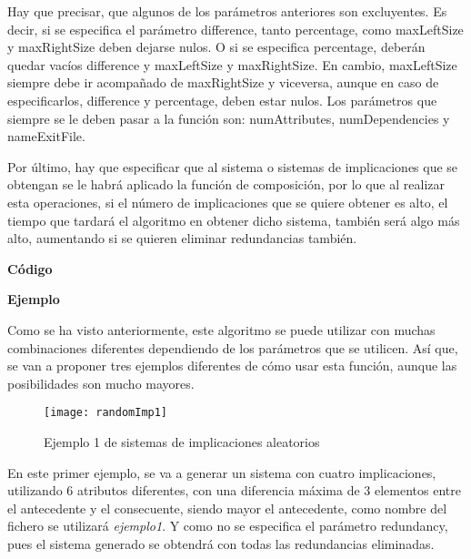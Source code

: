     Hay que precisar, que algunos de los par\'ametros anteriores son excluyentes. Es decir, si se especifica el par\'ametro difference, tanto 
    percentage, como maxLeftSize y maxRightSize deben dejarse nulos. O si se especifica percentage, deber\'an quedar vac\'ios difference y 
    maxLeftSize y maxRightSize. 
    En cambio, maxLeftSize siempre debe ir acompa\~nado de maxRightSize y viceversa, aunque en caso de especificarlos, difference y percentage, 
    deben estar nulos.
    Los par\'ametros que siempre se le deben pasar a la funci\'on son: numAttributes, numDependencies y nameExitFile.

    Por \'ultimo, hay que especificar que al sistema o sistemas de implicaciones que se obtengan se le habr\'a aplicado 
    la funci\'on de composici\'on, por lo que al realizar esta operaciones, si el n\'umero de implicaciones que se quiere obtener es 
    alto, el tiempo que tardar\'a el algoritmo en obtener dicho sistema, tambi\'en ser\'a algo m\'as alto, aumentando si se quieren 
    eliminar redundancias tambi\'en.
    \\

    \bigskip

    \textbf{C\'odigo}

    
    \bigskip


    \textbf{Ejemplo}

    Como se ha visto anteriormente, este algoritmo se puede utilizar con muchas combinaciones diferentes dependiendo de los par\'ametros 
    que se utilicen. As\'i que, se van a proponer tres ejemplos diferentes de c\'omo usar esta funci\'on, aunque las posibilidades 
    son mucho mayores.

    \bigskip

    \begin{figure}[H]
        \centering
        \texttt{[image: randomImp1]}
        \caption{Ejemplo 1 de sistemas de implicaciones aleatorios}
        \label{fig:randomImp1}
    \end{figure}

    En este primer ejemplo, se va a generar un sistema con cuatro implicaciones, utilizando 6 atributos diferentes, con una diferencia m\'axima 
    de 3 elementos entre el antecedente y el consecuente, siendo mayor el antecedente, como nombre del fichero se utilizar\'a \textit{ejemplo1}. 
    Y como no se especifica el par\'ametro redundancy, pues el sistema generado se obtendr\'a con todas las redundancias eliminadas.
    
